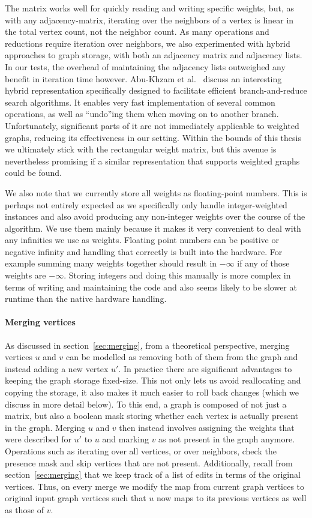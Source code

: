 \documentclass[12pt,oneside,english,parskip=full,headings=small]{scrbook}
\theoremstyle{definition}
\begin{document}
The matrix works well for quickly reading and writing specific weights, but, as with any
adjacency-matrix, iterating over the neighbors of a vertex is linear in the total vertex count, not
the neighbor count. As many operations and reductions require iteration over neighbors, we also
experimented with hybrid approaches to graph storage, with both an adjacency matrix and adjacency
lists. In our tests, the overhead of maintaining the adjacency lists outweighed any benefit in
iteration time however. Abu-Khzam et al.~\cite{AbuKhzam} discuss an interesting hybrid
representation specifically designed to facilitate efficient branch-and-reduce search algorithms. It
enables very fast implementation of several common operations, as well as ``undo''ing them when
moving on to another branch. Unfortunately, significant parts of it are not immediately applicable
to weighted graphs, reducing its effectiveness in our setting. Within the bounds of this thesis we
ultimately stick with the rectangular weight matrix, but this avenue is nevertheless promising if a
similar representation that supports weighted graphs could be found.

We also note that we currently store all weights as floating-point numbers. This is perhaps not
entirely expected as we specifically only handle integer-weighted instances and also avoid producing
any non-integer weights over the course of the algorithm. We use them mainly because it makes it
very convenient to deal with any infinities we use as weights. Floating point numbers can be
positive or negative infinity and handling that correctly is built into the hardware. For example
summing many weights together should result in $-\infty$ if any of those weights are $-\infty$.
Storing integers and doing this manually is more complex in terms of writing and maintaining the
code and also seems likely to be slower at runtime than the native hardware handling.

\paragraph{Merging vertices} As discussed in section~\ref{sec:merging}, from a theoretical
perspective, merging vertices $u$ and $v$ can be modelled as removing both of them from the graph
and instead adding a new vertex $u'$. In practice there are significant advantages to keeping the
graph storage fixed-size. This not only lets us avoid reallocating and copying the storage, it also
makes it much easier to roll back changes (which we discuss in more detail below). To this end, a
graph is composed of not just a matrix, but also a boolean mask storing whether each vertex is
actually present in the graph. Merging $u$ and $v$ then instead involves assigning the weights that
were described for $u'$ to $u$ and marking $v$ as not present in the graph anymore. Operations such
as iterating over all vertices, or over neighbors, check the presence mask and skip vertices that
are not present. Additionally, recall from section~\ref{sec:merging} that we keep track of a list of
edits in terms of the original vertices. Thus, on every merge we modify the map from current graph
vertices to original input graph vertices such that $u$ now maps to its previous vertices as well as
those of $v$.
\end{document}
